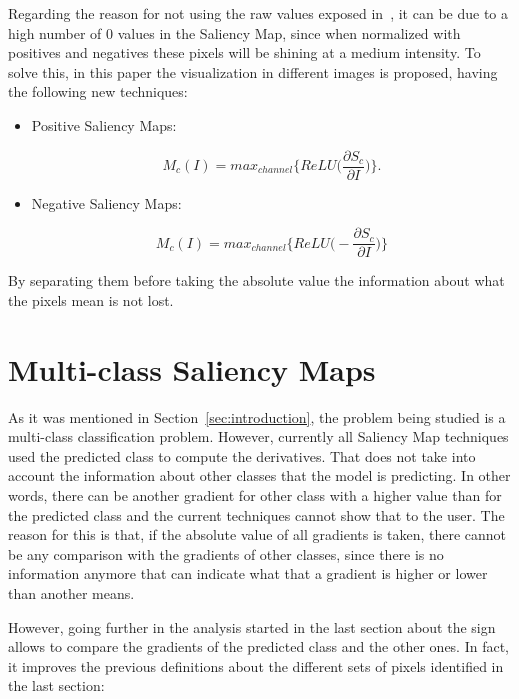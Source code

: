 \documentclass[preprint,12pt]{elsarticle}
\begin{document}
Regarding the reason for not using the raw values exposed in~\cite{smilkovSmoothGradRemovingNoise}, it can be due to a high number of 0 values in the Saliency Map, since when normalized with positives and negatives these pixels will be shining at a medium intensity. To solve this, in this paper the visualization in different images is proposed, having the following new techniques:

\begin{itemize}
    \item Positive Saliency Maps:
    
    \begin{equation}
        \label{eq: positive saliency map}
        M_c(I) = max_{channel}\bigg \{ ReLU \bigg (\frac{\partial S_c}{\partial I} \bigg ) \bigg \}.
    \end{equation}

    \item Negative Saliency Maps:
    
    \begin{equation}
        \label{eq: negative saliency map}
        M_c(I) = max_{channel}\bigg \{ ReLU \bigg (-\frac{\partial S_c}{\partial I} \bigg ) \bigg \}
    \end{equation}

\end{itemize}

By separating them before taking the absolute value the information about what the pixels mean is not lost. 

\section{Multi-class Saliency Maps}
\label{sec:multi-class saliency map}
As it was mentioned in Section~\ref{sec:introduction}, the problem being studied is a multi-class classification problem. However, currently all Saliency Map techniques used the predicted class to compute the derivatives. That does not take into account the information about other classes that the model is predicting. In other words, there can be another gradient for other class with a higher value than for the predicted class and the current techniques cannot show that to the user. The reason for this is that, if the absolute value of all gradients is taken, there cannot be any comparison with the gradients of other classes, since there is no information anymore that can indicate what that a gradient is higher or lower than another means.

However, going further in the analysis started in the last section about the sign allows to compare the gradients of the predicted class and the other ones. In fact, it improves the previous definitions about the different sets of pixels identified in the last section:
\end{document}
